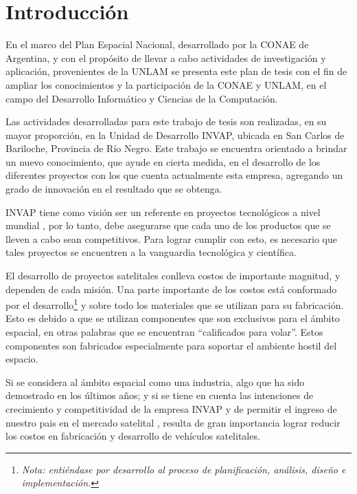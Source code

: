 \chapter{Introducción}\label{chap:intro}
En el marco del Plan Espacial Nacional, desarrollado por la \ac{CONAE} de Argentina, y con el propósito de llevar a cabo actividades de investigación y 
aplicación, provenientes de la \ac{UNLAM} se presenta este plan de tesis con el fin de ampliar los 
conocimientos y la participación de la \ac{CONAE} y \ac{UNLAM}, en el campo del Desarrollo Informático y 
Ciencias de la Computación.

Las actividades desarrolladas para este trabajo de tesis son realizadas, en su mayor proporción, en 
la Unidad de Desarrollo \ac{INVAP}, ubicada en San Carlos de Bariloche, Provincia de Río Negro. Este 
trabajo se encuentra orientado a brindar un nuevo conocimiento, que ayude en cierta medida, en el 
desarrollo de los diferentes proyectos con los que cuenta actualmente esta empresa, agregando un 
grado de innovación en el resultado que se obtenga.

\ac{INVAP} tiene como visión ser un referente en proyectos tecnológicos a nivel mundial \citep{invapWEB}, 
por lo tanto, debe asegurarse que cada uno de los productos que se lleven a cabo sean competitivos. 
Para lograr cumplir con esto, es necesario que tales proyectos se encuentren a la vanguardia 
tecnológica y científica.  

El desarrollo de proyectos satelitales conlleva costos de importante magnitud, y 
dependen de cada misión. Una parte importante de los costos está conformado por el 
desarrollo\footnote{\textit{Nota: entiéndase por desarrollo al proceso de planificación, análisis, 
diseño e implementación.}} y sobre todo los materiales que se utilizan para su fabricación. Esto 
es debido a que se utilizan componentes que son exclusivos para el ámbito espacial, en otras 
palabras que se encuentran ``calificados para volar''. Estos componentes son fabricados especialmente para soportar el ambiente hostil del espacio.

Si se considera al ámbito espacial como una industria, algo que ha sido demostrado en los últimos 
años; y si se tiene en cuenta las intenciones de crecimiento y competitividad de la empresa INVAP y de permitir el ingreso de nuestro pais en el mercado satelital \cite{invapWEB}, resulta de gran 
importancia lograr reducir los costos en fabricación y desarrollo de vehículos satelitales.

